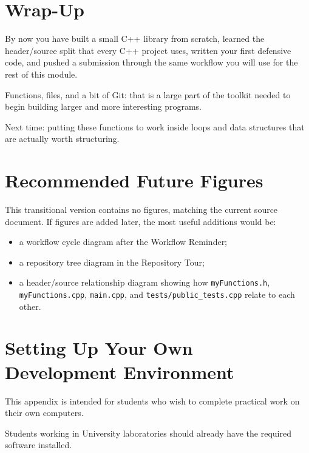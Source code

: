 \documentclass{csc2059practical}
\begin{document}
\section{Wrap-Up}

\begin{wrapupbox}
By now you have built a small C++ library from scratch, learned the header/source split that every C++ project uses, written your first defensive code, and pushed a submission through the same workflow you will use for the rest of this module.

Functions, files, and a bit of Git: that is a large part of the toolkit needed to begin building larger and more interesting programs.

Next time: putting these functions to work inside loops and data structures that are actually worth structuring.
\end{wrapupbox}

\section{Recommended Future Figures}

\begin{tipbox}
This transitional version contains no figures, matching the current source document. If figures are added later, the most useful additions would be:

\begin{itemize}
  \item a workflow cycle diagram after the Workflow Reminder;
  \item a repository tree diagram in the Repository Tour;
  \item a header/source relationship diagram showing how \texttt{myFunctions.h}, \texttt{myFunctions.cpp}, \texttt{main.cpp}, and \texttt{tests/public\_tests.cpp} relate to each other.
\end{itemize}
\end{tipbox}

\startappendices

\section{Setting Up Your Own Development Environment}

This appendix is intended for students who wish to complete practical work on their own computers.

Students working in University laboratories should already have the required software installed.
\end{document}
